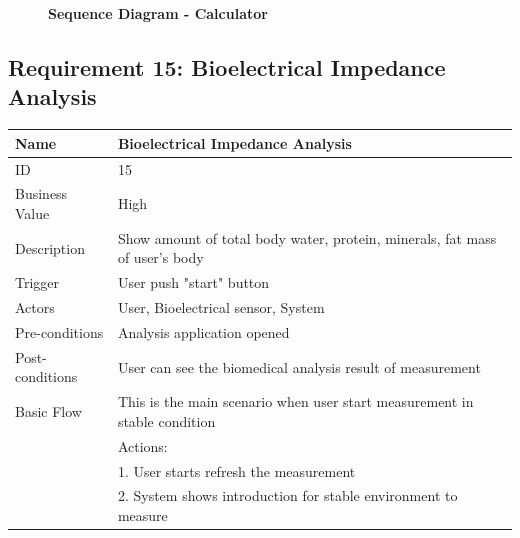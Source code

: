 \documentclass{article}
\begin{document}
		\begin{figure}[htbp]
			\textbf{Sequence Diagram - Calculator}
			\centering
			\begin{subfigure}{\textwidth}
				\centering
				\scalebox{0.8}{}
			\end{subfigure}
			\begin{subfigure}{\textwidth}
				
			\end{subfigure}
		\end{figure}
		\clearpage   
		
		\subsection{Requirement 15: Bioelectrical Impedance Analysis}
		\begin{table}[htbp]
			\centering
			\small
			\begin{tabularx}{\textwidth}{|>{\raggedright\arraybackslash}p{}|X|}
				\hline
				Name             & Bioelectrical Impedance Analysis                                \\ \hline
				ID               & 15                                                                                       \\ \hline
				Business Value   & High                                                                                    \\ \hline
				Description      & Show amount of total body water, protein, minerals, fat mass of user's body \\ \hline
				Trigger          & User push "start" button \\ \hline
				Actors           & User, Bioelectrical sensor, System                                \\ \hline
				Pre-conditions   & Analysis application opened                                  \\ \hline
				Post-conditions  & User can see the biomedical analysis result of measurement                                              \\ \hline
				Basic Flow       & This is the main scenario when user start measurement in stable condition \\ \hline
								 & Actions: \\
								 & 1. User starts refresh the measurement \\
								 & 2. System shows introduction for stable environment to measure \\

\end{tabularx}
\end{table}
\end{document}
